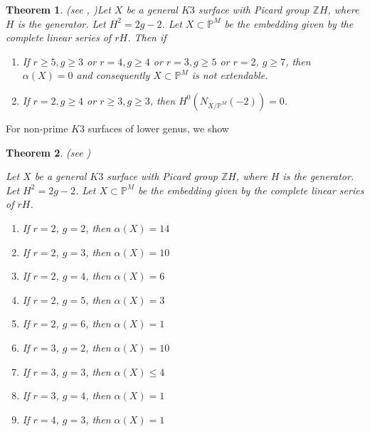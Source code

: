 \documentclass[11pt,twoside]{amsart}
\theoremstyle{plain}
\numberwithin{equation}{section}
\newtheorem{theorem}{Theorem}[section]
\theoremstyle{definition}
\begin{document}
\begin{theorem}(see , )\label{non-extendability of K3 surfaces intro}
    Let $X$ be a general $K3$ surface with Picard group $\mathbb{Z}H$, where $H$ is the generator. Let $H^2 = 2g-2$. Let $X \subset \mathbb{P}^M$ be the embedding given by the complete linear series of $rH$. Then if
    \begin{enumerate}
        \item[(1)] If $r \geq 5, g \geq 3$ or $r = 4, g \geq 4$ or $r = 3, g \geq 5$ or $r = 2$, $g \geq 7$, then $\alpha(X) = 0$ and consequently $X \subset \mathbb{P}^M$ is not extendable. 
        
        \item[(2)] If $r = 2, g \geq 4$ or $r \geq 3, g \geq 3$, then $H^0(N_{X/\mathbb{P}^M}(-2)) = 0$.
        
        
    \end{enumerate}
\end{theorem}

 \par

\vspace{0.2cm}

For non-prime $K3$ surfaces of lower genus, we show 

\begin{theorem}(see )\label{ZL for lower genus $K3$ surfaces intro}

Let $X$ be a general $K3$ surface with Picard group $\mathbb{Z}H$, where $H$ is the generator. Let $H^2 = 2g-2$. Let $X \subset \mathbb{P}^M$ be the embedding given by the complete linear series of $rH$. 
    \begin{enumerate}
        \item If $r = 2$, $g = 2$, then $\alpha(X) = 14$ 
        \item If $r = 2$, $g = 3$, then $\alpha(X) = 10$ 
        \item If $r = 2$, $g = 4$, then $\alpha(X) = 6$ 
        \item If $r = 2$, $g = 5$, then $\alpha(X) = 3$ 
        \item If $r = 2$, $g = 6$, then $\alpha(X) = 1$ 
        \item If $r = 3$, $g = 2$, then $\alpha(X) = 10$ 
        \item If $r = 3$, $g = 3$, then $\alpha(X) \leq 4$
        \item If $r = 3$, $g = 4$, then $\alpha(X) = 1$ 
        \item If $r = 4$, $g = 3$, then $\alpha(X) = 1$
        
       
        
    \end{enumerate}
    
\end{theorem}
\end{document}
